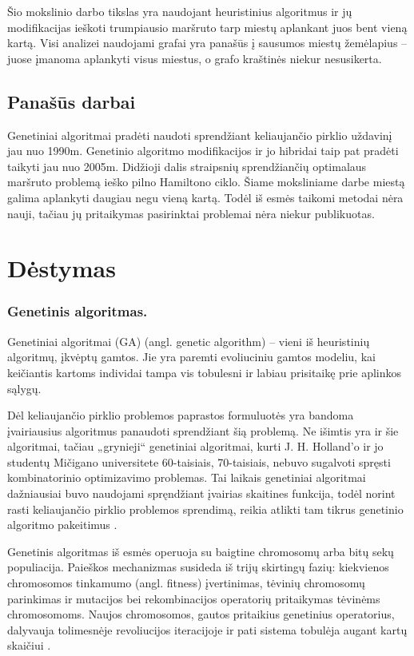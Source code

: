 \documentclass[runningheads,a4paper]{llncs}
\begin{document}
Šio mokslinio darbo tikslas yra naudojant heuristinius algoritmus ir jų modifikacijas ieškoti trumpiausio maršruto tarp miestų aplankant juos bent vieną kartą. Visi analizei naudojami grafai yra panašūs į sausumos miestų žemėlapius – juose įmanoma aplankyti visus miestus, o grafo kraštinės niekur nesusikerta.


\subsection{Panašūs darbai}

Genetiniai algoritmai pradėti naudoti sprendžiant keliaujančio pirklio uždavinį jau nuo 1990m. Genetinio algoritmo modifikacijos ir jo hibridai taip pat pradėti taikyti jau nuo 2005m. Didžioji dalis straipsnių sprendžiančių optimalaus maršruto problemą ieško pilno Hamiltono ciklo. Šiame moksliniame darbe miestą galima aplankyti daugiau negu vieną kartą. Todėl iš esmės taikomi metodai nėra nauji, tačiau jų pritaikymas pasirinktai problemai nėra niekur publikuotas.

\section{Dėstymas}


\subsubsection{Genetinis algoritmas.}

Genetiniai algoritmai (GA) (angl. genetic algorithm) – vieni iš heuristinių algoritmų, įkvėptų gamtos. Jie yra paremti evoliuciniu gamtos modeliu, kai keičiantis kartoms individai tampa vis tobulesni ir labiau prisitaikę prie aplinkos sąlygų.

Dėl keliaujančio pirklio problemos paprastos formuluotės yra bandoma įvairiausius algoritmus panaudoti sprendžiant šią problemą. Ne išimtis yra ir šie algoritmai, tačiau „grynieji“ genetiniai algoritmai, kurti J. H. Holland'o ir jo studentų Mičigano universitete 60-taisiais, 70-taisiais, nebuvo sugalvoti spręsti kombinatorinio optimizavimo problemas. Tai laikais genetiniai algoritmai dažniausiai buvo naudojami spręndžiant įvairias skaitines funkcija, todėl norint rasti keliaujančio pirklio problemos sprendimą, reikia atlikti tam tikrus genetinio algoritmo pakeitimus \cite{genetictsp}.

Genetinis algoritmas iš esmės operuoja su baigtine chromosomų arba bitų sekų populiacija. Paieškos mechanizmas susideda iš trijų skirtingų fazių: kiekvienos chromosomos tinkamumo (angl. fitness) įvertinimas, tėvinių chromosomų parinkimas ir mutacijos bei rekombinacijos operatorių pritaikymas tėvinėms chromosomoms. Naujos chromosomos, gautos pritaikius genetinius operatorius, dalyvauja tolimesnėje revoliucijos iteracijoje ir pati sistema tobulėja augant kartų skaičiui \cite{genetictsp}.
\end{document}
